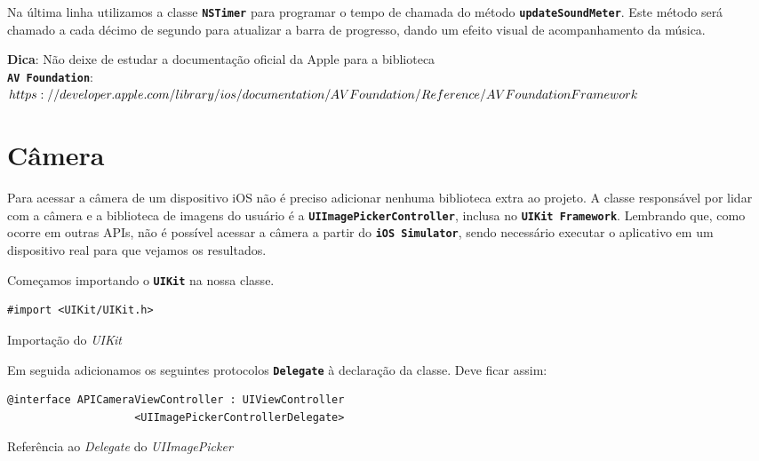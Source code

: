 \documentclass[a4paper,12pt,brazil,doubleside]{book}
\begin{document}
\begin{singlespace}
Na última linha utilizamos a classe \texttt{\textbf{NSTimer}} para programar o tempo de chamada do método \texttt{\textbf{updateSoundMeter}}. Este método será chamado a cada décimo de segundo para atualizar a barra de progresso, dando um efeito visual de acompanhamento da música.

\begin{framed}

\textbf{Dica}: Não deixe de estudar a documentação oficial da Apple para a biblioteca\\  \texttt{\textbf{AV Foundation}}:\\
\(https://developer.apple.com/library/ios/documentation/AVFoundation/Reference/\\AVFoundationFramework\)
\end{framed}

\section{Câmera}


Para acessar a câmera de um dispositivo iOS não é preciso adicionar nenhuma biblioteca extra ao projeto. A classe responsável por lidar com a câmera e a biblioteca de imagens do usuário é a \texttt{\textbf{UIImagePickerController}}, inclusa no \texttt{\textbf{UIKit Framework}}. Lembrando que, como ocorre em outras APIs, não é possível acessar a câmera a partir do \texttt{\textbf{iOS Simulator}}, sendo necessário executar o aplicativo em um dispositivo real para que vejamos os resultados.

Começamos importando o \texttt{\textbf{UIKit}} na nossa classe.

\begin{listing}[H]
\begin{verbatim}
#import <UIKit/UIKit.h>
\end{verbatim}
\caption{Importação do \emph{UIKit}}
\end{listing}


Em seguida adicionamos os seguintes protocolos \texttt{\textbf{Delegate}} à declaração da classe. Deve ficar assim:

\begin{listing}[H]
\begin{verbatim}
@interface APICameraViewController : UIViewController
                    <UIImagePickerControllerDelegate>
\end{verbatim}
\caption{Referência ao \emph{Delegate} do \emph{UIImagePicker}}
\end{listing}



\end{singlespace}
\end{document}

